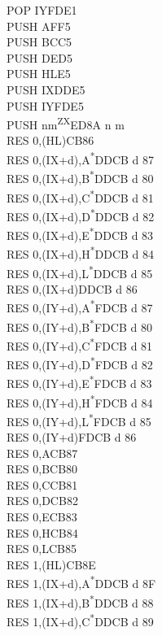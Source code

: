 \documentclass[twoside,openright,a4paper]{book}
\begin{document}
\begin{multicols}{3}
{\begin{tabbing}
	POP IY\>FDE1\\
	PUSH AF\>F5\\
	PUSH BC\>C5\\
	PUSH DE\>D5\\
	PUSH HL\>E5\\
	PUSH IX\>DDE5\\
	PUSH IY\>FDE5\\
	PUSH nm\textsuperscript{ZX}\>ED8A n m\\
	RES 0,(HL)\>CB86\\
	RES 0,(IX+d),A\textsuperscript{*}\>DDCB d 87\\
	RES 0,(IX+d),B\textsuperscript{*}\>DDCB d 80\\
	RES 0,(IX+d),C\textsuperscript{*}\>DDCB d 81\\
	RES 0,(IX+d),D\textsuperscript{*}\>DDCB d 82\\
	RES 0,(IX+d),E\textsuperscript{*}\>DDCB d 83\\
	RES 0,(IX+d),H\textsuperscript{*}\>DDCB d 84\\
	RES 0,(IX+d),L\textsuperscript{*}\>DDCB d 85\\
	RES 0,(IX+d)\>DDCB d 86\\
	RES 0,(IY+d),A\textsuperscript{*}\>FDCB d 87\\
	RES 0,(IY+d),B\textsuperscript{*}\>FDCB d 80\\
	RES 0,(IY+d),C\textsuperscript{*}\>FDCB d 81\\
	RES 0,(IY+d),D\textsuperscript{*}\>FDCB d 82\\
	RES 0,(IY+d),E\textsuperscript{*}\>FDCB d 83\\
	RES 0,(IY+d),H\textsuperscript{*}\>FDCB d 84\\
	RES 0,(IY+d),L\textsuperscript{*}\>FDCB d 85\\
	RES 0,(IY+d)\>FDCB d 86\\
	RES 0,A\>CB87\\
	RES 0,B\>CB80\\
	RES 0,C\>CB81\\
	RES 0,D\>CB82\\
	RES 0,E\>CB83\\
	RES 0,H\>CB84\\
	RES 0,L\>CB85\\
	RES 1,(HL)\>CB8E\\
	RES 1,(IX+d),A\textsuperscript{*}\>DDCB d 8F\\
	RES 1,(IX+d),B\textsuperscript{*}\>DDCB d 88\\
	RES 1,(IX+d),C\textsuperscript{*}\>DDCB d 89\\

\end{tabbing}}
\end{multicols}
\end{document}
